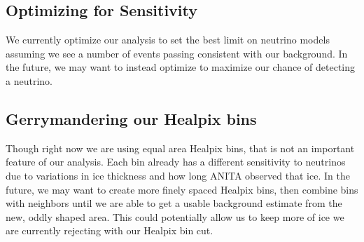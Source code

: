 \subsection{Optimizing for Sensitivity}

We currently optimize our analysis to set the best limit on neutrino models assuming we see a number of events passing consistent with our background. In the future, we may want to instead optimize to maximize our chance of detecting a neutrino.

\subsection{Gerrymandering our Healpix bins}

Though right now we are using equal area Healpix bins, that is not an important feature of our analysis.  Each bin already has a different sensitivity to neutrinos due to variations in ice thickness and how long ANITA observed that ice.  In the future, we may want to create more finely spaced Healpix bins, then combine bins with neighbors until we are able to get a usable background estimate from the new, oddly shaped area.  This could potentially allow us to keep more of ice we are currently rejecting with our Healpix bin cut.  
